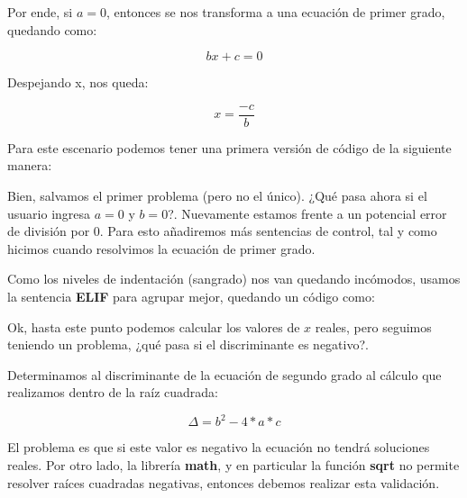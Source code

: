 \begin{enumerate}[{Ejercicio} 1.]
    Por ende, si \(a=0\), entonces se nos transforma a una ecuación de primer grado, quedando como:
    
    \[ bx + c = 0 \]
    
    Despejando x, nos queda:

    \[ x = \frac{-c}{b} \]
    
    Para este escenario podemos tener una primera versión de código de la siguiente manera:\\

    \begin{listing}[H]
    \end{listing}

    Bien, salvamos el primer problema (pero no el único). ¿Qué pasa ahora si el usuario ingresa \(a=0\) y \(b=0\)?. Nuevamente estamos frente a un potencial error de división por 0. Para esto añadiremos más sentencias de control, tal y como hicimos cuando resolvimos la ecuación de primer grado.\\

    \begin{listing}[H]
    \end{listing}
    
    Como los niveles de indentación (sangrado) nos van quedando incómodos, usamos la sentencia \textbf{ELIF} para agrupar mejor, quedando un código como:\\

    \begin{listing}[H]
    \end{listing}

    Ok, hasta este punto podemos calcular los valores de \(x\) reales, pero seguimos teniendo un problema, ¿qué pasa si el discriminante es negativo?.

    Determinamos al discriminante de la ecuación de segundo grado al cálculo que realizamos dentro de la raíz cuadrada:

    \[ \Delta = b^2 - 4 * a * c \]

    El problema es que si este valor es negativo la ecuación no tendrá soluciones reales. Por otro lado, la librería \textbf{math}, y en particular la función \textbf{sqrt} no permite resolver raíces cuadradas negativas, entonces debemos realizar esta validación.\\

    \begin{listing}[H]
    \end{listing}


\end{enumerate}
